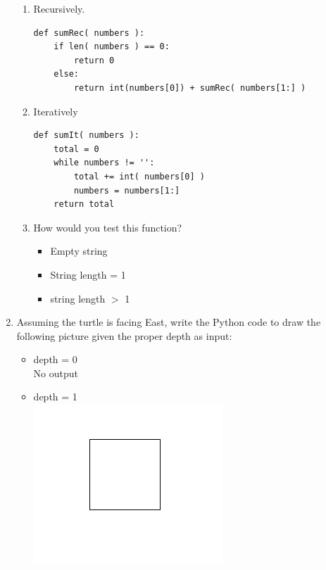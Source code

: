 \documentclass[11pt]{article}
\newenvironment{answer}{\large\lstset{basicstyle=\large}\color{white}}{}
\newenvironment{answer}{\large\lstset{basicstyle=\large}\color{red}}{}
\begin{document}
\begin{enumerate}
        \begin{enumerate}
            \item Recursively.
\begin{answer}
\begin{lstlisting}
def sumRec( numbers ):
    if len( numbers ) == 0:
        return 0
    else:
        return int(numbers[0]) + sumRec( numbers[1:] )
\end{lstlisting}
\end{answer}

            \item Iteratively
\begin{answer}
\begin{lstlisting}
def sumIt( numbers ):
    total = 0
    while numbers != '':
        total += int( numbers[0] )
        numbers = numbers[1:]
    return total
\end{lstlisting}
\end{answer}
            \item How would you test this function?
                \begin{answer}
                \begin{itemize}
                    \item Empty string 
                    \item String length = 1
                    \item string length $>$ 1
                \end{itemize}
                \end{answer}
\pagebreak
\end{enumerate}
\item Assuming the turtle is facing East, write the Python code to draw the following picture given the proper depth as input:
    \begin{itemize}
            \item depth = 0
           \\No output 
            \item depth = 1\\
            \includegraphics[scale=0.4]{1.png}

\end{itemize}
\end{enumerate}
\end{document}
